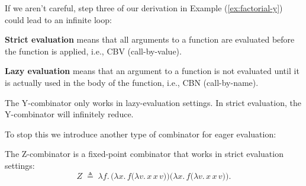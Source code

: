 \noindent
If we aren't careful, step three of our derivation in Example (\ref{ex:factorial-y}) could lead to an infinite loop:

\begin{Def}

    \label{def:strict-vs-lazy}
    \noindent
    \textbf{Strict evaluation} means that all arguments to a function are evaluated before the function is applied, i.e., CBV (call-by-value).

    \noindent
    \textbf{Lazy evaluation} means that an argument to a function is not evaluated until it is actually used in the body of the function, i.e., CBN (call-by-name).
\end{Def}

\begin{theo}

    \label{theo:y-combinator-lazy}
    \noindent
    The Y-combinator only works in lazy-evaluation settings. In strict evaluation, the Y-combinator will infinitely reduce.
\end{theo}

\noindent
To stop this we introduce another type of combinator for eager evaluation:
\begin{Def}[Z-Combinator]
    
        \label{def:z-combinator}
        \noindent
        The Z-combinator is a fixed-point combinator that works in strict evaluation settings:
        \LARGE
        \[
        Z \;\triangleq\; 
        \lambda f.\,\bigl(\lambda x.\,f\bigl(\lambda v.\,x\,x\,v\bigr)\bigr)
                    \bigl(\lambda x.\,f\bigl(\lambda v.\,x\,x\,v\bigr)\bigr).
        \]
        \normalsize
\end{Def}

